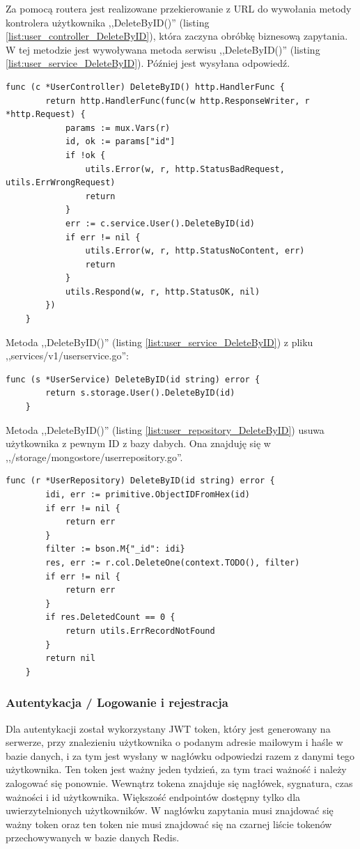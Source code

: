 Za pomocą routera jest realizowane przekierowanie z URL do wywołania metody kontrolera użytkownika ,,DeleteByID()'' (listing \ref{list:user_controller_DeleteByID}), która zaczyna obróbkę biznesową zapytania.
W tej metodzie jest wywoływana metoda serwisu ,,DeleteByID()'' (listing \ref{list:user_service_DeleteByID}). Później jest wysyłana odpowiedź.
\begin{lstlisting}[label=list:user_controller_DeleteByID,caption=Kontroler usunięcia użytkownika,basicstyle=\tiny\ttfamily]
    func (c *UserController) DeleteByID() http.HandlerFunc {
        return http.HandlerFunc(func(w http.ResponseWriter, r *http.Request) {
            params := mux.Vars(r)
            id, ok := params["id"]
            if !ok {
                utils.Error(w, r, http.StatusBadRequest, utils.ErrWrongRequest)
                return
            }
            err := c.service.User().DeleteByID(id)
            if err != nil {
                utils.Error(w, r, http.StatusNoContent, err)
                return
            }
            utils.Respond(w, r, http.StatusOK, nil)
        })
    }
\end{lstlisting}
Metoda ,,DeleteByID()'' (listing \ref{list:user_service_DeleteByID}) z pliku ,,services/v1/userservice.go'':
\begin{lstlisting}[label=list:user_service_DeleteByID,caption=Serwis usunięcia użytkownika,basicstyle=\tiny\ttfamily]
    func (s *UserService) DeleteByID(id string) error {
        return s.storage.User().DeleteByID(id)
    }
\end{lstlisting}
% 
Metoda ,,DeleteByID()'' (listing \ref{list:user_repository_DeleteByID}) usuwa użytkownika z pewnym ID z bazy dabych.
Ona znajduję się w ,,/storage/mongostore/userrepository.go''.
\begin{lstlisting}[label=list:user_repository_DeleteByID,caption=Usunięcie uzytkownika z bazy danych,basicstyle=\tiny\ttfamily]
    func (r *UserRepository) DeleteByID(id string) error {
        idi, err := primitive.ObjectIDFromHex(id)
        if err != nil {
            return err
        }
        filter := bson.M{"_id": idi}
        res, err := r.col.DeleteOne(context.TODO(), filter)
        if err != nil {
            return err
        }
        if res.DeletedCount == 0 {
            return utils.ErrRecordNotFound
        }
        return nil
    }
\end{lstlisting}
\newpage
\subsubsection{Autentykacja / Logowanie i rejestracja}
\label{sec:autentykacja}
Dla autentykacji został wykorzystany JWT token, który jest generowany na serwerze, przy znalezieniu użytkownika o podanym adresie mailowym i haśle w bazie danych, i za tym jest wysłany w nagłówku odpowiedzi razem z danymi tego użytkownika.
Ten token jest ważny jeden tydzień, za tym traci ważność i należy zalogować się ponownie. Wewnątrz tokena znajduje się nagłówek, sygnatura, czas ważności i id użytkownika.
Większość endpointów dostępny tylko dla uwierzytelnionych użytkowników. W nagłówku zapytania musi znajdować się ważny token oraz ten token nie musi znajdować się na czarnej liście tokenów przechowywanych w bazie danych Redis.

